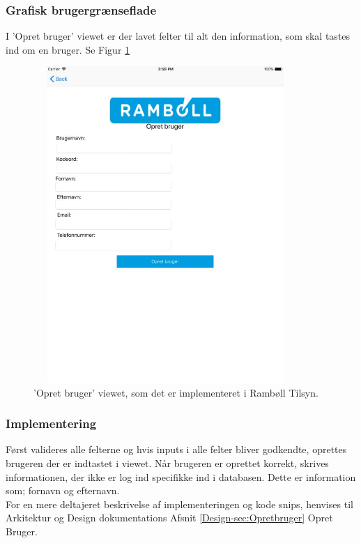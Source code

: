 \subsubsection{Grafisk brugergrænseflade}
I 'Opret bruger' viewet er der lavet felter til alt den information, som skal tastes ind om en bruger. Se Figur \ref{fig:OpretBrugerView}
\begin{figure}[H] %
	\centering
	\includegraphics[height=12cm, width=10cm]{Design/Applikation/OpretBruger/OpretBrugerView}
	\caption{'Opret bruger' viewet, som det er implementeret i Rambøll Tilsyn.}
	\label{fig:OpretBrugerView}
\end{figure}

\subsubsection{Implementering}
Først valideres alle felterne og hvis inputs i alle felter bliver godkendte, oprettes brugeren der er indtastet i viewet. Når brugeren er oprettet korrekt, skrives informationen, der ikke er log ind specifikke ind i databasen. Dette er information som; fornavn og efternavn. \\
For en mere deltajeret beskrivelse af implementeringen og kode snips, henvises til Arkitektur og Design dokumentations Afsnit \ref{Design-sec:Opretbruger} Opret Bruger.


\clearpage